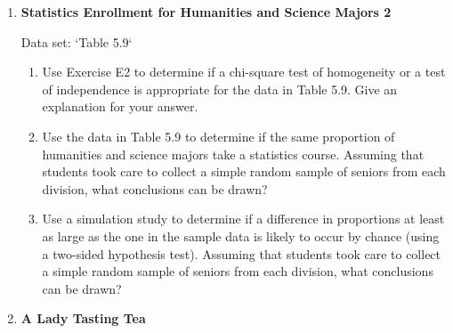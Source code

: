 \documentclass[
]{book}
\begin{document}
\begin{enumerate}
  \begin{enumerate}
    \item Was either the explanatory (row) or the response (column) variable fixed before the study was conducted?
    \item Is this an example of an experiment or an observational study?
    \item Is this a cross-classification, cohort, or case-control study?
    \item Create a segmented bar chart for the data.
    \item Create a simulation study to test the one-sided hypothesis that science majors are more likely to take a statistics course. Provide a \textit{p}-value. Assuming that students took care to collect a simple random sample of seniors from each division, what conclusions can be drawn?
    \item Use Fisher’s exact test to test the one-sided hypothesis that science majors are more likely to take a statistics course. Provide a \textit{p}-value. Assuming that students took care to collect a simple random sample of seniors from each division, what conclusions can be drawn?
  \end{enumerate}

  \item \textbf{Statistics Enrollment for Humanities and Science Majors 2}    

  Data set: `Table 5.9`    
  \begin{enumerate}
    \item Use Exercise E2 to determine if a chi-square test of homogeneity or a test of independence is appropriate for the data in Table 5.9. Give an explanation for your answer.
    \item Use the data in Table 5.9 to determine if the same proportion of humanities and science majors take a statistics course. Assuming that students took care to collect a simple random sample of seniors from each division, what conclusions can be drawn?
    \item Use a simulation study to determine if a difference in proportions at least as large as the one in the sample data is likely to occur by chance (using a two-sided hypothesis test). Assuming that students took care to collect a simple random sample of seniors from each division, what conclusions can be drawn?
  \end{enumerate}

  \item \textbf{A Lady Tasting Tea}    


\end{enumerate}
\end{document}
